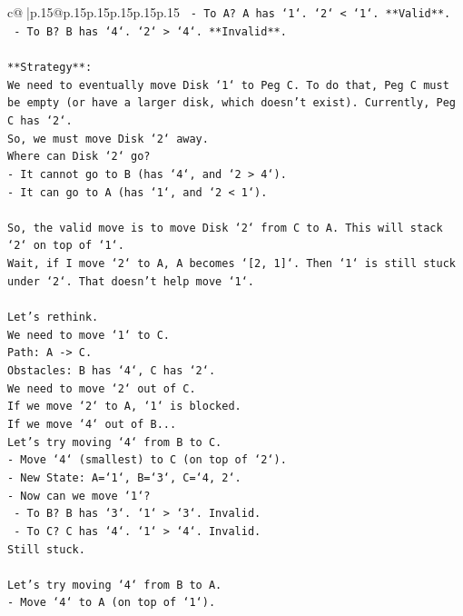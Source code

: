 \documentclass{article}
\begin{document}
{\begin{supertabular}{c@{$\;$}|p{.15\linewidth}@{}p{.15\linewidth}p{.15\linewidth}p{.15\linewidth}p{.15\linewidth}p{.15\linewidth}}
{{{\texttt{  {-} To A? A has `1`. `2` < `1`. **Valid**.} \\
\texttt{  {-} To B? B has `4`. `2` > `4`. **Invalid**.} \\
\\ 
\texttt{**Strategy**:} \\
\texttt{We need to eventually move Disk `1` to Peg C. To do that, Peg C must be empty (or have a larger disk, which doesn't exist). Currently, Peg C has `2`.} \\
\texttt{So, we must move Disk `2` away.} \\
\texttt{Where can Disk `2` go?} \\
\texttt{{-} It cannot go to B (has `4`, and `2 > 4`).} \\
\texttt{{-} It can go to A (has `1`, and `2 < 1`).} \\
\\ 
\texttt{So, the valid move is to move Disk `2` from C to A. This will stack `2` on top of `1`.} \\
\texttt{Wait, if I move `2` to A, A becomes `{[}2, 1{]}`. Then `1` is still stuck under `2`. That doesn't help move `1`.} \\
\\ 
\texttt{Let's rethink.} \\
\texttt{We need to move `1` to C.} \\
\texttt{Path: A {-}> C.} \\
\texttt{Obstacles: B has `4`, C has `2`.} \\
\texttt{We need to move `2` out of C.} \\
\texttt{If we move `2` to A, `1` is blocked.} \\
\texttt{If we move `4` out of B...} \\
\texttt{Let's try moving `4` from B to C.} \\
\texttt{{-} Move `4` (smallest) to C (on top of `2`).} \\
\texttt{{-} New State: A=`1`, B=`3`, C=`4, 2`.} \\
\texttt{{-} Now can we move `1`?} \\
\texttt{  {-} To B? B has `3`. `1` > `3`. Invalid.} \\
\texttt{  {-} To C? C has `4`. `1` > `4`. Invalid.} \\
\texttt{Still stuck.} \\
\\ 
\texttt{Let's try moving `4` from B to A.} \\
\texttt{{-} Move `4` to A (on top of `1`).} \\
}}}
\end{supertabular}}
\end{document}

